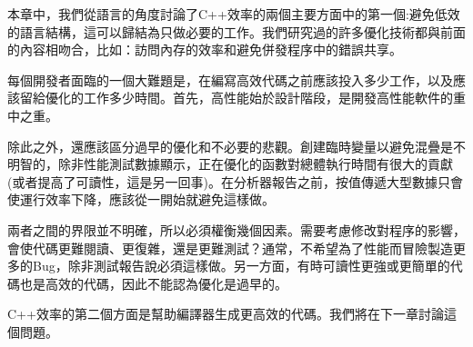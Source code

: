 本章中，我們從語言的角度討論了C++效率的兩個主要方面中的第一個:避免低效的語言結構，這可以歸結為只做必要的工作。我們研究過的許多優化技術都與前面的內容相吻合，比如：訪問內存的效率和避免併發程序中的錯誤共享。

每個開發者面臨的一個大難題是，在編寫高效代碼之前應該投入多少工作，以及應該留給優化的工作多少時間。首先，高性能始於設計階段，是開發高性能軟件的重中之重。 

除此之外，還應該區分過早的優化和不必要的悲觀。創建臨時變量以避免混疊是不明智的，除非性能測試數據顯示，正在優化的函數對總體執行時間有很大的貢獻(或者提高了可讀性，這是另一回事)。在分析器報告之前，按值傳遞大型數據只會使運行效率下降，應該從一開始就避免這樣做。 

兩者之間的界限並不明確，所以必須權衡幾個因素。需要考慮修改對程序的影響，會使代碼更難閱讀、更復雜，還是更難測試？通常，不希望為了性能而冒險製造更多的Bug，除非測試報告說必須這樣做。另一方面，有時可讀性更強或更簡單的代碼也是高效的代碼，因此不能認為優化是過早的。 

C++效率的第二個方面是幫助編譯器生成更高效的代碼。我們將在下一章討論這個問題。